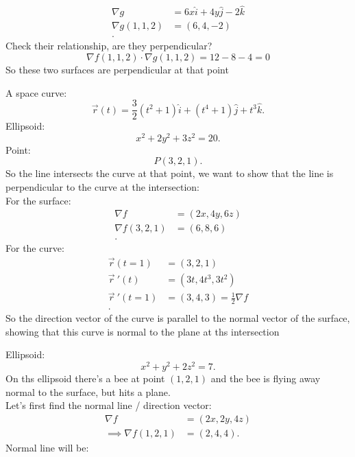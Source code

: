 \begin{itemize}
\begin{example}
\begin{align*}
	\nabla g &= 6x\hat{i} + 4y\hat{j} - 2\hat{k} \\
	\nabla g\left( 1,1,2 \right)  &=  \left( 6,4,-2 \right)  \\
.\end{align*}
Check their relationship, are they perpendicular?
\begin{equation}
	\nabla f\left( 1,1,2 \right)  \cdot  \nabla g\left( 1,1,2 \right)  = 12 - 8 - 4 = 0
\end{equation}
So these two surfaces are perpendicular at that point
\end{example}
\begin{example}
	A space curve:
	\[
	\vec{r}(t) = \frac{3}{2}\left( t^2+1 \right) \hat{i} + \left( t^4+1 \right) \hat{j} + t^3\hat{k}
	.\] 
	Ellipsoid:
	\[
	x^2 + 2y^2 + 3z^2 = 20
	.\] 
	Point:
	\[
	P(3,2,1)
	.\]
	So the line intersects the curve at that point, we want to show that the line is perpendicular to the curve at the intersection:\\
	For the surface:
	\begin{align*}
		\nabla f &= \left( 2x,4y,6z \right) \\
		\nabla f\left( 3,2,1 \right)  &=  \left( 6,8,6 \right)  \\
	.\end{align*}
	For the curve:
	\begin{align*}
		\vec{r}(t=1) &=  \left( 3,2,1 \right)  \\
		\vec{r}~' (t) &=  \left( 3t , 4t^3, 3t^2 \right)  \\
		\vec{r}~'\left( t=1 \right)  &=  \left( 3,4,3 \right)  = \frac{1}{2}\nabla f \\
	.\end{align*}
	So the direction vector of the curve is parallel to the normal vector of the surface, showing that this curve is normal to the plane at ths intersection
\end{example}
\begin{example}
	Ellipsoid:
	\[
	x^2 + y^2 + 2z^2 = 7
	.\] 
	On ths ellipsoid there's a bee at point $\left( 1,2,1 \right) $ and the bee is flying away normal to the surface, but hits a plane.\\
	Let's first find the normal line / direction vector:
	\begin{align*}
		\nabla f &=  \left( 2x,2y,4z \right)\\
		\implies \nabla f\left( 1,2,1 \right)  &= \left( 2,4,4 \right) 
	.\end{align*}
	Normal line will be:
	\begin{align*}

\end{align*}
\end{example}
\end{itemize}
